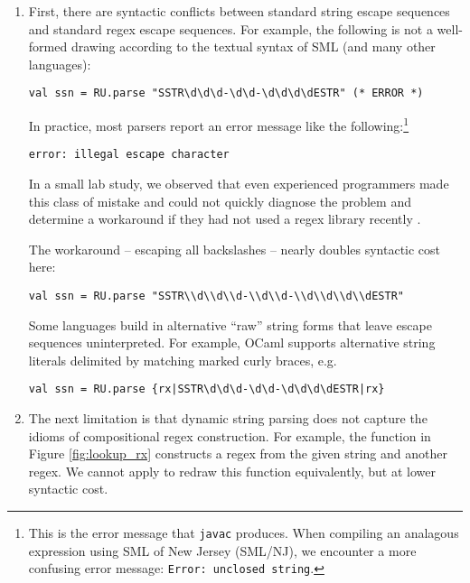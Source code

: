 \begin{enumerate} 
\item First, there are syntactic conflicts between standard string escape sequences and standard regex escape sequences. For example, the following is not a well-formed drawing according to the textual syntax of SML (and many other languages):
\begin{lstlisting}[numbers=none,mathescape=|]
val ssn = RU.parse "SSTR\d\d\d-\d\d-\d\d\d\dESTR" (* ERROR *)
\end{lstlisting}
In practice, most parsers report an error message like the following:\footnote{This is the error message that \texttt{javac} produces. When compiling an analagous expression using SML of New Jersey (SML/NJ), we encounter a more confusing error message: \texttt{Error: unclosed string}.}
\begin{lstlisting}[numbers=none]
error: illegal escape character
\end{lstlisting}
In a small lab study, we observed that even experienced programmers made this class of mistake and could not quickly diagnose the problem and determine a workaround if they had not used a regex library recently  \cite{Omar:2012:ACC:2337223.2337324}.

The workaround -- escaping all backslashes -- nearly doubles syntactic cost here:
\begin{lstlisting}[numbers=none]
val ssn = RU.parse "SSTR\\d\\d\\d-\\d\\d-\\d\\d\\d\\dESTR"
\end{lstlisting}

Some languages build in alternative ``raw'' string forms that leave escape sequences uninterpreted. For example, OCaml supports alternative string literals delimited by matching marked curly braces, e.g. 
\begin{lstlisting}[numbers=none]
val ssn = RU.parse {rx|SSTR\d\d\d-\d\d-\d\d\d\dESTR|rx}
\end{lstlisting}
\item The next limitation is that dynamic string parsing does not capture  the idioms of compositional regex construction. 
For example, the function  in Figure \ref{fig:lookup_rx} constructs a regex from the given string and another regex. We cannot apply  to redraw this function equivalently, but at lower syntactic cost. 


\end{enumerate}
